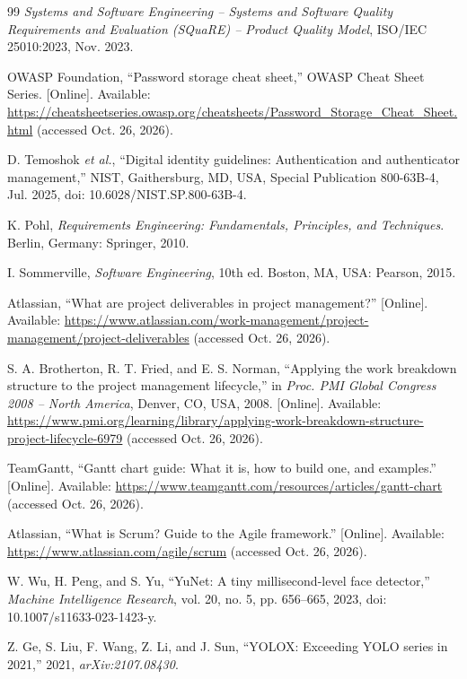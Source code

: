 \begin{thebibliography}{99}
 \textit{Systems and Software Engineering -- Systems and Software Quality Requirements and Evaluation (SQuaRE) -- Product Quality Model}, ISO/IEC 25010:2023, Nov. 2023.

 OWASP Foundation, ``Password storage cheat sheet,'' OWASP Cheat Sheet Series. [Online]. Available: \url{https://cheatsheetseries.owasp.org/cheatsheets/Password_Storage_Cheat_Sheet.html} (accessed Oct. 26, 2026).

 D. Temoshok \textit{et al.}, ``Digital identity guidelines: Authentication and authenticator management,'' NIST, Gaithersburg, MD, USA, Special Publication 800-63B-4, Jul. 2025, doi: 10.6028/NIST.SP.800-63B-4.

 K. Pohl, \textit{Requirements Engineering: Fundamentals, Principles, and Techniques}. Berlin, Germany: Springer, 2010.

 I. Sommerville, \textit{Software Engineering}, 10th ed. Boston, MA, USA: Pearson, 2015.

 Atlassian, ``What are project deliverables in project management?'' [Online]. Available: \url{https://www.atlassian.com/work-management/project-management/project-deliverables} (accessed Oct. 26, 2026).

 S. A. Brotherton, R. T. Fried, and E. S. Norman, ``Applying the work breakdown structure to the project management lifecycle,'' in \textit{Proc. PMI Global Congress 2008 -- North America}, Denver, CO, USA, 2008. [Online]. Available: \url{https://www.pmi.org/learning/library/applying-work-breakdown-structure-project-lifecycle-6979} (accessed Oct. 26, 2026).

 TeamGantt, ``Gantt chart guide: What it is, how to build one, and examples.'' [Online]. Available: \url{https://www.teamgantt.com/resources/articles/gantt-chart} (accessed Oct. 26, 2026).

 Atlassian, ``What is Scrum? Guide to the Agile framework.'' [Online]. Available: \url{https://www.atlassian.com/agile/scrum} (accessed Oct. 26, 2026).

 W. Wu, H. Peng, and S. Yu, ``YuNet: A tiny millisecond-level face detector,'' \textit{Machine Intelligence Research}, vol. 20, no. 5, pp. 656--665, 2023, doi: 10.1007/s11633-023-1423-y.

 Z. Ge, S. Liu, F. Wang, Z. Li, and J. Sun, ``YOLOX: Exceeding YOLO series in 2021,'' 2021, \textit{arXiv:2107.08430}.


\end{thebibliography}
